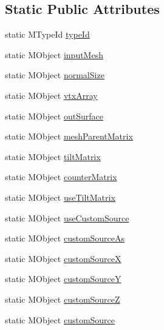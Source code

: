 \subsection*{Static Public Attributes}
\begin{DoxyCompactItemize}
\item 
static M\-Type\-Id \hyperlink{class_m_g__extrude_edge_aaed482a60e12f396d096d215a6e42cdb}{type\-Id}
\item 
static M\-Object \hyperlink{class_m_g__extrude_edge_a0933668cde5a769442b3110e75387110}{input\-Mesh}
\item 
static M\-Object \hyperlink{class_m_g__extrude_edge_a157ab849f390de93e28105e717941c8f}{normal\-Size}
\item 
static M\-Object \hyperlink{class_m_g__extrude_edge_ad2e8f28509086a9e64d6809da10a500d}{vtx\-Array}
\item 
static M\-Object \hyperlink{class_m_g__extrude_edge_a4f81064a39824fb7ea6b8e4d0afcd2d6}{out\-Surface}
\item 
static M\-Object \hyperlink{class_m_g__extrude_edge_a907b882e00ddf5cc7edc6b49fb9a7d60}{mesh\-Parent\-Matrix}
\item 
static M\-Object \hyperlink{class_m_g__extrude_edge_a2a1366099fa1e1ddd4c0a6f13d449b90}{tilt\-Matrix}
\item 
static M\-Object \hyperlink{class_m_g__extrude_edge_a1909e4adf43d003b24afb361c17d5b12}{counter\-Matrix}
\item 
static M\-Object \hyperlink{class_m_g__extrude_edge_ac48bec269a369720c8c9a6c2b4019a32}{use\-Tilt\-Matrix}
\item 
static M\-Object \hyperlink{class_m_g__extrude_edge_a48540ff0750d6a192422b99ab9041559}{use\-Custom\-Source}
\item 
static M\-Object \hyperlink{class_m_g__extrude_edge_a665694b78faf733a4ae0058cd9ecd6be}{custom\-Source\-As}
\item 
static M\-Object \hyperlink{class_m_g__extrude_edge_aa00c8eee45d314e14ba5694800fc9a46}{custom\-Source\-X}
\item 
static M\-Object \hyperlink{class_m_g__extrude_edge_a120e3fd5173dce6aa14f7cc2fe2647e9}{custom\-Source\-Y}
\item 
static M\-Object \hyperlink{class_m_g__extrude_edge_aa4f066c45836661f0a1066c5f8373a35}{custom\-Source\-Z}
\item 
static M\-Object \hyperlink{class_m_g__extrude_edge_a810bf474f970d9b05f55a5224341cf51}{custom\-Source}
\end{DoxyCompactItemize}


